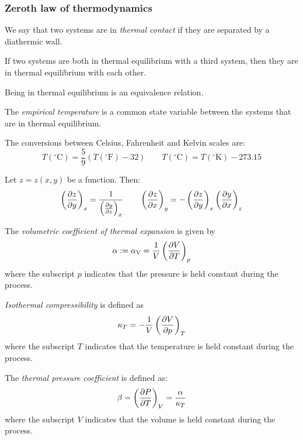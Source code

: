 \documentclass[../../../main_physics.tex]{subfiles}
\begin{document}
\begin{multicols}{2}
  \subsubsection{Zeroth law of thermodynamics}
  \begin{definition}
    We say that two systems are in \emph{thermal contact} if they are separated by a diathermic wall.
  \end{definition}
  \begin{law}
    If two systems are both in thermal equilibrium with a third system, then they are in thermal equilibrium with each other.
  \end{law}
  \begin{corollary}
    Being in thermal equilibrium is an equivalence relation.
  \end{corollary}
  \begin{definition}
    The \emph{empirical temperature} is a common state variable between the systems that are in thermal equilibrium.
  \end{definition}
  \begin{proposition}
    The conversions between Celsius, Fahrenheit and Kelvin scales are:
    $$T(^\circ\text{C})=\frac{5}{9}\left(T(^\circ\text{F})-32\right)\qquad T(^\circ\text{C})=T(^\circ\text{K})-273.15$$
  \end{proposition}
  \begin{proposition}
    Let $z=z(x,y)$ be a function. Then:
    $$\left(\pdv{z}{y}\right)_x=\frac{1}{\left(\pdv{y}{z}\right)_x}\qquad\left(\pdv{z}{x}\right)_y=-\left(\pdv{z}{y}\right)_x\left(\pdv{y}{x}\right)_z$$
  \end{proposition}
  \begin{definition}
    The \emph{volumetric coefficient of thermal expansion} is given by
    $$\alpha:=\alpha_\text{V}=\frac{1}{V}\left(\pdv{V}{T}\right)_p$$
    where the subscript $p$ indicates that the pressure is held constant during the process.
  \end{definition}
  \begin{definition}[Compressibility]
    \emph{Isothermal compressibility} is defined as
    $$\kappa_T=-\frac{1}{V}\left(\pdv{V}{p}\right)_T$$
    where the subscript $T$ indicates that the temperature is held constant during the process.
  \end{definition}
  \begin{definition}
    The \emph{thermal pressure coefficient} is defined as:
    $$\beta=\left(\pdv{P}{T}\right)_V=\frac{\alpha}{\kappa_T}$$
    where the subscript $V$ indicates that the volume is held constant during the process.
  \end{definition}

\end{multicols}
\end{document}
